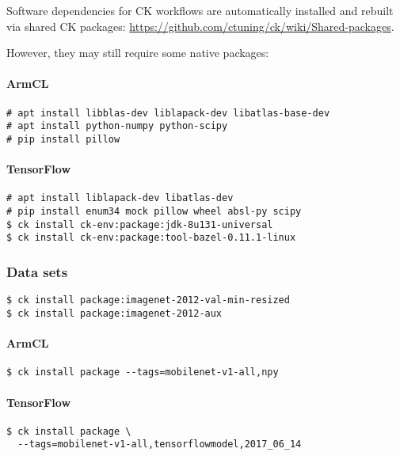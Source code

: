 Software dependencies for CK workflows are automatically installed and rebuilt 
via shared CK packages: \url{https://github.com/ctuning/ck/wiki/Shared-packages}.

However, they may still require some native packages:

\paragraph{ArmCL}

\begin{verbatim}
# apt install libblas-dev liblapack-dev libatlas-base-dev
# apt install python-numpy python-scipy
# pip install pillow
\end{verbatim}

\paragraph{TensorFlow}

\begin{verbatim}
# apt install liblapack-dev libatlas-dev
# pip install enum34 mock pillow wheel absl-py scipy
$ ck install ck-env:package:jdk-8u131-universal
$ ck install ck-env:package:tool-bazel-0.11.1-linux
\end{verbatim}

\subsubsection{Data sets}

\begin{verbatim}
$ ck install package:imagenet-2012-val-min-resized
$ ck install package:imagenet-2012-aux
\end{verbatim}

\paragraph{ArmCL}

\begin{verbatim}
$ ck install package --tags=mobilenet-v1-all,npy
\end{verbatim}

\paragraph{TensorFlow}

\begin{verbatim}
$ ck install package \
  --tags=mobilenet-v1-all,tensorflowmodel,2017_06_14 
\end{verbatim}


